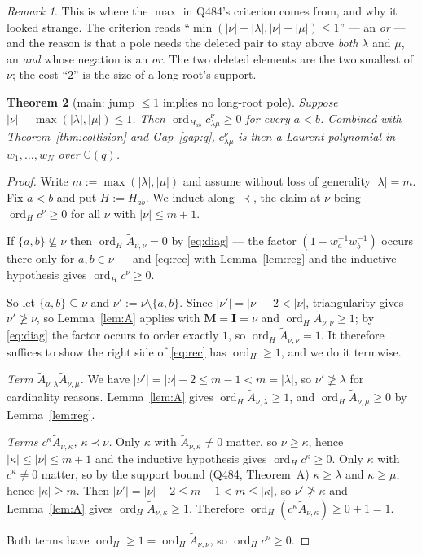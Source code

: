 \documentclass[11pt]{article}
\theoremstyle{plain}
\newtheorem{thm}{Theorem}
\theoremstyle{definition}
\theoremstyle{remark}
\newtheorem{rem}[thm]{Remark}
\theoremstyle{plain}
\newcommand{\bI}{\mathbf{I}}
\newcommand{\bM}{\mathbf{M}}
\newcommand{\At}{\widetilde{A}}
\newcommand{\ord}{\operatorname{ord}}
\begin{document}
\begin{rem}
This is where the $\max$ in Q484's criterion comes from, and why it looked
strange.  The criterion reads ``$\min(|\nu|-|\lambda|,|\nu|-|\mu|)\le1$'' ---
an \emph{or} --- and the reason is that a pole needs the deleted pair to stay
above \emph{both} $\lambda$ and $\mu$, an \emph{and} whose negation is an
\emph{or}.  The two deleted elements are the two smallest of $\nu$; the cost
``$2$'' is the size of a long root's support.
\end{rem}

\begin{thm}[main: jump $\le1$ implies no long-root pole]\label{thm:main}
Suppose $|\nu|-\max(|\lambda|,|\mu|)\le1$.  Then
$\ord_{H_{ab}}c^{\nu}_{\lambda\mu}\ge0$ for every $a<b$.  Combined with
Theorem~\ref{thm:collision} and Gap~\ref{gap:q}, $c^{\nu}_{\lambda\mu}$ is then
a Laurent polynomial in $w_1,\dots,w_N$ over $\mathbb{C}(q)$.
\end{thm}
\begin{proof}
Write $m:=\max(|\lambda|,|\mu|)$ and assume without loss of generality
$|\lambda|=m$.  Fix $a<b$ and put $H:=H_{ab}$.  We induct along $\prec$, the
claim at $\nu$ being $\ord_Hc^{\nu}\ge0$ for all $\nu$ with $|\nu|\le m+1$.

If $\{a,b\}\not\subseteq\nu$ then $\ord_H\At_{\nu,\nu}=0$ by \eqref{eq:diag}
--- the factor $(1-w_a^{-1}w_b^{-1})$ occurs there only for $a,b\in\nu$ --- and
\eqref{eq:rec} with Lemma~\ref{lem:reg} and the inductive hypothesis gives
$\ord_Hc^{\nu}\ge0$.

So let $\{a,b\}\subseteq\nu$ and $\nu':=\nu\setminus\{a,b\}$.  Since
$|\nu'|=|\nu|-2<|\nu|$, triangularity gives $\nu'\not\ge\nu$, so
Lemma~\ref{lem:A} applies with $\bM=\bI=\nu$ and
$\ord_H\At_{\nu,\nu}\ge1$; by \eqref{eq:diag} the factor occurs to order
exactly $1$, so $\ord_H\At_{\nu,\nu}=1$.  It therefore suffices to show the
right side of \eqref{eq:rec} has $\ord_H\ge1$, and we do it termwise.

\emph{Term $\At_{\nu,\lambda}\At_{\nu,\mu}$.}  We have
$|\nu'|=|\nu|-2\le m-1<m=|\lambda|$, so $\nu'\not\ge\lambda$ for cardinality
reasons.  Lemma~\ref{lem:A} gives $\ord_H\At_{\nu,\lambda}\ge1$, and
$\ord_H\At_{\nu,\mu}\ge0$ by Lemma~\ref{lem:reg}.

\emph{Terms $c^{\kappa}\At_{\nu,\kappa}$, $\kappa\prec\nu$.}  Only $\kappa$
with $\At_{\nu,\kappa}\ne0$ matter, so $\nu\ge\kappa$, hence
$|\kappa|\le|\nu|\le m+1$ and the inductive hypothesis gives
$\ord_Hc^{\kappa}\ge0$.  Only $\kappa$ with $c^{\kappa}\ne0$ matter, so by the
support bound (Q484, Theorem~A) $\kappa\ge\lambda$ and $\kappa\ge\mu$, hence
$|\kappa|\ge m$.  Then $|\nu'|=|\nu|-2\le m-1<m\le|\kappa|$, so
$\nu'\not\ge\kappa$ and Lemma~\ref{lem:A} gives
$\ord_H\At_{\nu,\kappa}\ge1$.  Therefore
$\ord_H(c^{\kappa}\At_{\nu,\kappa})\ge0+1=1$.

Both terms have $\ord_H\ge1=\ord_H\At_{\nu,\nu}$, so
$\ord_Hc^{\nu}\ge0$.
\end{proof}
\end{document}
